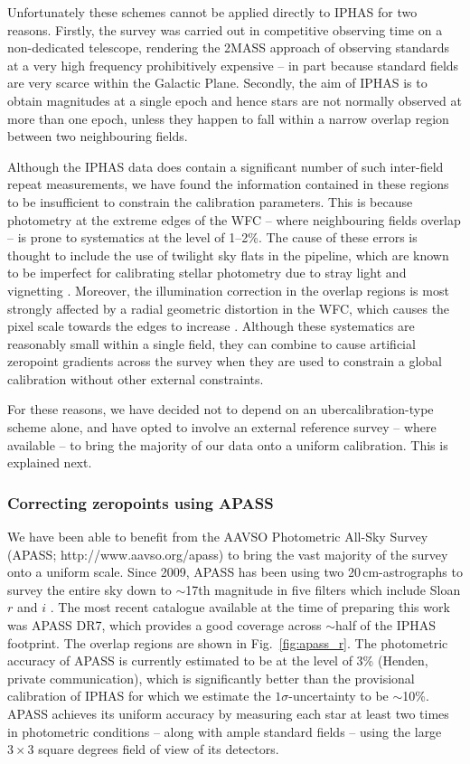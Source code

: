 \documentclass[useAMS,usenatbib]{mn2e}
\begin{document}
Unfortunately these schemes cannot be applied
directly to IPHAS
for two reasons. 
Firstly, the survey was carried out 
in competitive observing time
on a non-dedicated telescope, 
rendering the 2MASS approach 
of observing standards at a very high frequency
prohibitively expensive
-- in part because standard fields 
are very scarce within the Galactic Plane.
Secondly, the aim of IPHAS is to obtain magnitudes at a single epoch
and hence stars are not normally observed at more than one epoch,
unless they happen to fall within a narrow overlap region 
between two neighbouring fields.

Although the IPHAS data does contain a significant number of 
such inter-field repeat measurements,
we have found the information contained
in these regions to be insufficient
to constrain the calibration parameters.
This is because photometry at the extreme edges of the WFC
-- where neighbouring fields overlap -- 
is prone to systematics at the level of 1--2\%.
The cause of these errors is thought to include 
the use of twilight sky flats in the pipeline,
which are known to be imperfect for calibrating stellar photometry 
due to stray light and vignetting \citep[e.g.][]{Manfroid1995}.
Moreover, the illumination correction in the overlap regions
is most strongly affected by a radial geometric distortion in the WFC,
which causes the pixel scale towards the edges 
to increase \citep{Gonzalez-Solares2011}.
Although these systematics are reasonably small within a single field,
they can combine to cause artificial zeropoint gradients 
across the survey
when they are used to constrain a global calibration
without other external constraints.

For these reasons, we have decided not to depend
on an ubercalibration-type scheme alone,
and have opted to involve an external reference survey
-- where available --
to bring the majority of our data onto a uniform calibration.
This is explained next.

\subsubsection{Correcting zeropoints using APASS}

We have been able to benefit from the
AAVSO Photometric All-Sky Survey
(APASS; http://www.aavso.org/apass)
to bring the vast majority of the survey 
onto a uniform scale.
Since 2009,
APASS has been using two 20\,cm-astrographs
to survey the entire sky down to $\sim$17th magnitude
in five filters which include Sloan $r$ and $i$ \citep{Henden2012}.
The most recent catalogue available 
at the time of preparing this work was APASS DR7,
which provides a good coverage across $\sim$half
of the IPHAS footprint.
The overlap regions are shown in Fig.~\ref{fig:apass_r}.
The photometric accuracy of APASS is currently estimated 
to be at the level of 3\% (Henden, private communication),
which is significantly better 
than the provisional calibration of IPHAS
for which we estimate the $1\sigma$-uncertainty to be $\sim$10\%.
APASS achieves its uniform accuracy 
by measuring each star at least two times in photometric conditions
-- along with ample standard fields --
using the large $3\times3$ square degrees field of view of its detectors.
\end{document}
